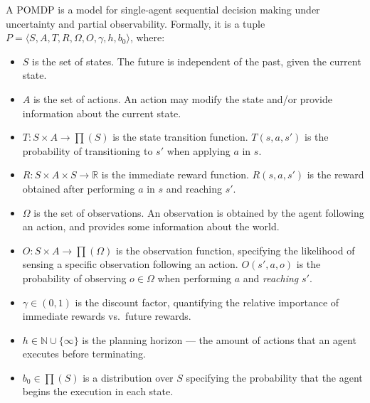 \documentclass[letterpaper]{article} %
\newcommand{\eliran}[1]{\textbf{[\color{red}ELIRAN:#1]}}
\newcommand{\ronen}[1]{\textbf{[\color{blue}RONEN:#1]}}
\begin{document}
A POMDP is a model for single-agent sequential decision making under uncertainty and partial observability.
Formally, it is a tuple $P=\langle S, A, T, R, \Omega, O, \gamma, h, b_0 \rangle$, where:
\begin{itemize}
\item
$S$ is the set of states. The future is independent of the past, given the current state.
\item
$A$ is the set of actions. An action may modify the state and/or
provide information about the current state.
\item
$T: S \times A \rightarrow \prod(S)$ is the state transition function.  $T(s, a, s')$ is the probability of transitioning to $s'$ when applying $a$ in $s$. 
\item
$R:S \times A \times S \rightarrow \mathbb{R}$  is the immediate reward function. $R(s,a, s')$ is the reward obtained after performing $a$ in $s$  and reaching $s'$. 
\item
$\Omega$ is the set of observations. An observation is obtained by the agent following an action, and provides some  information about the world.
\item
$O:S \times A \rightarrow \prod (\Omega)$ is the observation function, specifying the likelihood of sensing a specific observation following an action. $O(s', a, o)$ is the probability of observing $o\in \Omega$ when performing $a$ and \emph{reaching} $s'$. 
\item
$\gamma \in (0,1)$ is the discount factor, quantifying the relative importance of immediate rewards vs.~future rewards.
\item
$h\in\mathbb{N}\cup\{\infty\}$ is the planning horizon --- the amount of actions that an agent executes before terminating. 

\item
$b_0\in \prod(S)$ is a distribution over $S$ specifying the probability that the agent begins the execution in each state.
\end{itemize}
\end{document}

